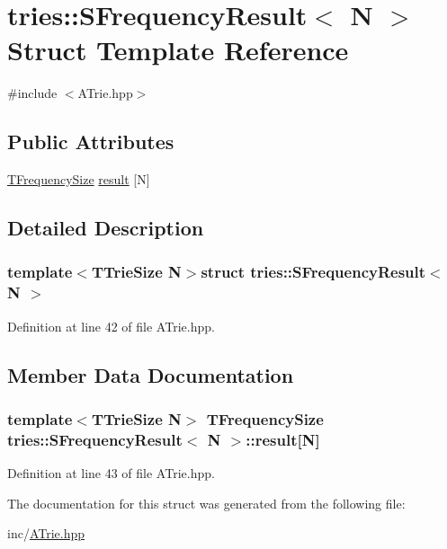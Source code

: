 \hypertarget{structtries_1_1_s_frequency_result}{}\section{tries\+:\+:S\+Frequency\+Result$<$ N $>$ Struct Template Reference}
\label{structtries_1_1_s_frequency_result}


{\ttfamily \#include $<$A\+Trie.\+hpp$>$}

\subsection*{Public Attributes}
\begin{DoxyCompactItemize}
\item 
\hyperlink{namespacetries_a3eaf32cf4423e228789e4387cd912d2a}{T\+Frequency\+Size} \hyperlink{structtries_1_1_s_frequency_result_a19708f5412b441f681b0e92308fcbd00}{result} \mbox{[}N\mbox{]}
\end{DoxyCompactItemize}


\subsection{Detailed Description}
\subsubsection*{template$<$T\+Trie\+Size N$>$struct tries\+::\+S\+Frequency\+Result$<$ N $>$}



Definition at line 42 of file A\+Trie.\+hpp.



\subsection{Member Data Documentation}
\hypertarget{structtries_1_1_s_frequency_result_a19708f5412b441f681b0e92308fcbd00}{}
\subsubsection[{result}]{\setlength{\rightskip}{0pt plus 5cm}template$<$T\+Trie\+Size N$>$ {\bf T\+Frequency\+Size} {\bf tries\+::\+S\+Frequency\+Result}$<$ N $>$\+::result\mbox{[}N\mbox{]}}\label{structtries_1_1_s_frequency_result_a19708f5412b441f681b0e92308fcbd00}


Definition at line 43 of file A\+Trie.\+hpp.



The documentation for this struct was generated from the following file\+:\begin{DoxyCompactItemize}
\item 
inc/\hyperlink{_a_trie_8hpp}{A\+Trie.\+hpp}\end{DoxyCompactItemize}
